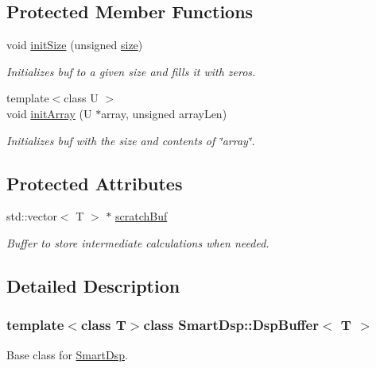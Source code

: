 \subsection*{Protected Member Functions}
\begin{DoxyCompactItemize}
\item 
void \hyperlink{class_smart_dsp_1_1_dsp_buffer_a9d60a71c8a895d525f45cfeeea377f1f}{init\+Size} (unsigned \hyperlink{class_smart_dsp_1_1_dsp_buffer_af931c57c26c1f459cae47ca4b249d402}{size})
\begin{DoxyCompactList}\small\item\em Initializes buf to a given size and fills it with zeros. \end{DoxyCompactList}\item 
{\footnotesize template$<$class U $>$ }\\void \hyperlink{class_smart_dsp_1_1_dsp_buffer_aa333e30a6c300ce340ff4702b53dc0bf}{init\+Array} (U $\ast$array, unsigned array\+Len)
\begin{DoxyCompactList}\small\item\em Initializes buf with the size and contents of \char`\"{}array\char`\"{}. \end{DoxyCompactList}\end{DoxyCompactItemize}
\subsection*{Protected Attributes}
\begin{DoxyCompactItemize}
\item 
std\+::vector$<$ T $>$ $\ast$ \hyperlink{class_smart_dsp_1_1_dsp_buffer_a4e15156afafbd16b0b7606f56f73d14f}{scratch\+Buf}
\begin{DoxyCompactList}\small\item\em Buffer to store intermediate calculations when needed. \end{DoxyCompactList}\end{DoxyCompactItemize}


\subsection{Detailed Description}
\subsubsection*{template$<$class T$>$class Smart\+Dsp\+::\+Dsp\+Buffer$<$ T $>$}

Base class for \hyperlink{namespace_smart_dsp}{Smart\+Dsp}. 

